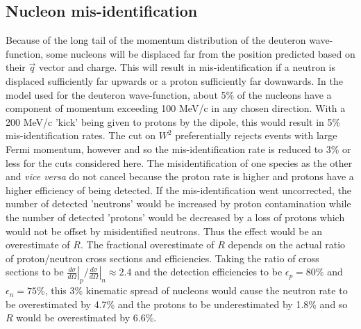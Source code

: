 \documentclass[12pt,letterpaper,oneside]{article}
\begin{document}
\subsection{Nucleon mis-identification}
Because of the long tail of the momentum distribution of the deuteron
wave-function, some nucleons will be displaced far from the position
predicted based on their $\vec q$ vector and charge.  This will result
in mis-identification if a neutron is displaced sufficiently far
upwards or a proton sufficiently far downwards.  In the
model used for the deuteron wave-function, about 5\% of the nucleons
have a component of momentum exceeding 100 MeV/c in any chosen
direction.  With a 200 MeV/c 'kick' being given to protons by the
dipole, this would result in 5\% mis-identification rates.  The cut on
$W^2$ preferentially rejects events with large Fermi momentum, however
and so the mis-identification rate is reduced to 3\% or less for the
cuts considered here.  The misidentification of one species as the
other and {\it vice versa} do not cancel because the proton rate is
higher and protons have a higher efficiency of being detected.   If the
mis-identification went uncorrected, the number of detected 'neutrons'
would be increased by proton contamination while the number of detected
'protons' would be decreased by a loss of protons which would not be
offset by misidentified neutrons.  Thus the effect would be an
overestimate of $R$.  The fractional overestimate of $R$ depends on
the actual ratio of proton/neutron cross sections and efficiencies.
Taking the ratio of cross sections to be 
$\left.\frac{d\sigma}{d\Omega}\right|_p/\left.\frac{d\sigma}{d\Omega}\right|_n
\approx 2.4$ and the detection efficiencies to be
$\epsilon_p=80$\% and $\epsilon_n=75$\%, this 3\% kinematic spread of
nucleons would cause the neutron rate to be overestimated by 4.7\% and
the protons to be underestimated by 1.8\% and so $R$ would be overestimated by 
6.6\%.  
\end{document}
